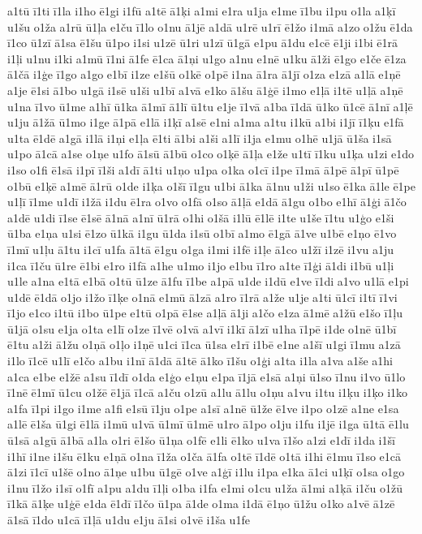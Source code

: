 {a1tū
ī1ti
ī1la
i1ho
ē1gi
i1fū
a1tē
ā1ķi
a1mi
e1ra
u1ja
e1me
ī1bu
i1pu
o1la
a1ķī
u1šu
o1ža
a1rū
ū1ļa
e1ču
ī1lo
o1nu
ā1jē
a1dā
u1rē
u1rī
ē1žo
i1mā
a1zo
o1žu
ē1da
ī1co
ū1zī
ā1sa
ē1šu
ū1po
i1si
u1zē
ū1ri
u1zī
ū1gā
e1pu
ā1du
e1cē
ē1ji
i1bi
ē1rā
i1ļi
u1nu
i1ki
a1mū
ī1ni
ā1fe
ē1ca
ā1ņi
u1go
a1nu
e1nē
u1ku
ā1ži
ē1go
e1če
ē1za
ā1čā
i1ģe
ī1go
a1go
e1bī
i1ze
e1šū
o1kē
o1pē
i1na
ā1ra
ā1jī
o1za
e1zā
a1lā
e1ņē
a1je
ē1si
ā1bo
u1gā
i1sē
u1ši
u1bī
a1vā
e1ko
ā1šu
ā1ģē
i1mo
e1ļā
i1tē
u1ļā
a1ņē
u1na
ī1vo
ū1me
a1hī
ū1ka
ā1mī
ā1lī
ū1tu
e1je
ī1vā
a1ba
ī1dā
ū1ko
ū1cē
ā1nī
a1ļē
u1ju
ā1žā
ū1mo
i1ge
ā1pā
e1lā
i1ķī
a1sē
e1ni
a1ma
a1tu
i1kū
a1bi
i1jī
ī1ķu
e1fā
u1ta
ē1dē
a1gā
i1lā
i1ņi
e1ļa
ē1ti
ā1bi
a1ši
a1lī
i1ja
e1mu
o1hē
u1jā
ū1ša
i1sā
u1po
ā1cā
a1se
o1ņe
u1fo
ā1sū
ā1bū
o1co
o1ķē
ā1ļa
e1že
u1tī
ī1ku
u1ķa
u1zi
e1do
i1so
o1fi
ē1sā
i1pī
ī1ši
a1dī
ā1ti
u1ņo
u1pa
o1ka
o1cī
i1pe
ī1mā
ā1pē
ā1pī
ū1pē
o1bū
e1ķē
a1mē
ā1rū
o1de
i1ķa
o1šī
ī1gu
u1bi
ā1ka
ā1nu
u1ži
u1so
ē1ka
ā1le
ē1pe
u1ļī
ī1me
u1dī
i1žā
i1du
ē1ra
o1vo
o1fā
o1so
ā1ļā
e1dā
ā1gu
o1bo
e1hī
ā1ģi
ā1čo
a1dē
u1di
ī1se
ē1sē
ā1nā
a1nī
ū1rā
o1hi
o1šā
i1lū
ē1lē
i1te
u1še
ī1tu
u1ģo
e1ši
ū1ba
e1ņa
u1si
ē1zo
ū1kā
i1gu
ū1da
i1sū
o1bī
a1mo
ē1gā
ā1ve
u1bē
e1ņo
ē1vo
ī1mī
u1ļu
ā1tu
i1cī
u1fa
ā1tā
ē1gu
o1ga
i1mi
i1fē
i1ļe
ā1co
u1žī
i1zē
i1vu
a1ju
i1ca
ī1ču
ū1re
ē1bi
e1ro
i1fā
a1he
u1mo
i1jo
e1bu
ī1ro
a1te
ī1ģi
ā1di
i1bū
u1ļi
u1le
a1na
e1tā
e1bā
o1tū
ū1ze
ā1fu
ī1be
a1pā
u1de
i1dū
e1ve
ī1di
a1vo
u1lā
e1pi
u1dē
ē1dā
o1jo
i1žo
ī1ķe
o1nā
e1mū
ā1zā
a1ro
ī1rā
a1že
u1je
a1ti
ū1cī
i1tī
ī1vi
ī1jo
e1co
i1tū
i1bo
ū1pe
e1tū
o1pā
ē1se
a1ļā
ā1ji
a1čo
e1za
ā1mē
a1žū
e1šo
ī1ļu
ū1jā
o1su
e1ja
o1ta
e1lī
o1ze
ī1vē
o1vā
a1vī
i1kī
ā1zī
u1ha
ī1pē
i1de
o1nē
ū1bī
ē1tu
a1ži
ā1žu
o1ņā
o1ļo
i1ņē
u1ci
ī1ca
ū1sa
e1rī
i1bē
e1ne
a1šī
u1gi
ī1mu
a1zā
i1lo
ī1cē
u1lī
e1čo
a1bu
i1nī
ā1dā
ā1tē
ā1ko
ī1šu
o1ģi
a1ta
i1la
a1va
a1še
a1hi
a1ca
e1be
e1žē
a1su
ī1dī
o1da
e1ģo
e1ņu
e1pa
ī1jā
e1sā
a1ņi
ū1so
ī1nu
i1vo
ū1lo
ī1nē
ē1mī
ū1cu
o1žē
ē1jā
ī1cā
a1ču
o1zū
a1lu
ā1lu
o1ņu
a1vu
i1tu
i1ķu
i1ķo
i1ko
a1fa
ī1pi
i1go
i1me
a1fi
e1sū
ī1ju
o1pe
a1sī
a1nē
ū1že
ē1ve
i1po
o1zē
a1ne
e1sa
a1lē
ē1ša
ū1gi
ē1lā
i1mū
u1vā
ū1mī
ū1mē
u1ro
ā1po
o1ju
i1fu
i1jē
i1ga
ū1tā
ē1lu
ū1sā
a1gū
ā1bā
a1la
o1ri
ē1šo
ū1ņa
o1fē
e1li
ē1ko
u1va
ī1šo
a1zi
e1dī
i1da
i1šī
i1hī
i1ne
i1šu
ē1ku
e1ņā
o1na
ī1ža
o1ča
ā1fa
o1tē
ī1dē
o1tā
i1hi
ē1mu
ī1so
e1cā
ā1zi
ī1cī
u1šē
o1no
ā1ņe
u1bu
ū1gē
o1ve
a1ģī
i1lu
i1pa
e1ka
ā1ci
u1ķī
o1sa
o1go
i1nu
ī1žo
i1sī
o1fī
a1pu
a1du
ī1ļi
o1ba
i1fa
e1mi
o1cu
u1ža
ā1mi
a1ķā
i1ču
o1žū
ī1kā
ā1ķe
u1ģē
e1da
ē1dī
ī1čo
ū1pa
ā1de
o1ma
i1dā
ē1ņo
ū1žu
o1ko
a1vē
ā1zē
ā1sā
ī1do
u1cā
ī1ļā
u1du
e1ju
ā1si
o1vē
i1ša
u1fe
}
